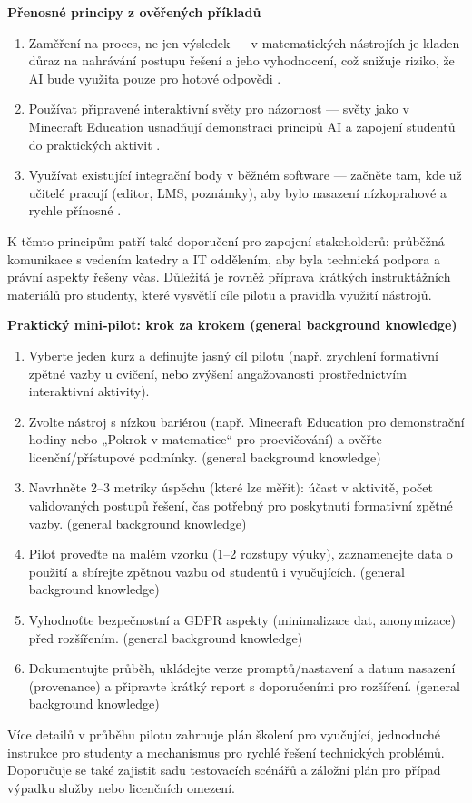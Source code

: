 \documentclass{report}%
\begin{document}
\bigskip
\noindent \textbf{Přenosné principy z ověřených příkladů}
\begin{enumerate}
  \item Zaměření na proces, ne jen výsledek — v matematických nástrojích je kladen důraz na nahrávání postupu řešení a jeho vyhodnocení, což snižuje riziko, že AI bude využita pouze pro hotové odpovědi \cite{kb_ai_101_tipu_pdf_04e4a115_page_8_1}.
  \item Používat připravené interaktivní světy pro názornost — světy jako v Minecraft Education usnadňují demonstraci principů AI a zapojení studentů do praktických aktivit \cite{kb_ai_101_tipu_pdf_04e4a115_page_15_2}.
  \item Využívat existující integrační body v běžném software — začněte tam, kde už učitelé pracují (editor, LMS, poznámky), aby bylo nasazení nízkoprahové a rychle přínosné \cite{kb_ai_101_tipu_pdf_04e4a115_page_14_1}.
\end{enumerate}
K těmto principům patří také doporučení pro zapojení stakeholderů: průběžná komunikace s vedením katedry a IT oddělením, aby byla technická podpora a právní aspekty řešeny včas.
Důležitá je rovněž příprava krátkých instruktážních materiálů pro studenty, které vysvětlí cíle pilotu a pravidla využití nástrojů.

\bigskip
\noindent \textbf{Praktický mini‑pilot: krok za krokem (general background knowledge)}
\begin{enumerate}
  \item Vyberte jeden kurz a definujte jasný cíl pilotu (např. zrychlení formativní zpětné vazby u cvičení, nebo zvýšení angažovanosti prostřednictvím interaktivní aktivity).
  \item Zvolte nástroj s nízkou bariérou (např. Minecraft Education pro demonstrační hodiny nebo „Pokrok v matematice“ pro procvičování) a ověřte licenční/přístupové podmínky. (general background knowledge)
  \item Navrhněte 2–3 metriky úspěchu (které lze měřit): účast v aktivitě, počet validovaných postupů řešení, čas potřebný pro poskytnutí formativní zpětné vazby. (general background knowledge)
  \item Pilot proveďte na malém vzorku (1–2 rozstupy výuky), zaznamenejte data o použití a sbírejte zpětnou vazbu od studentů i vyučujících. (general background knowledge)
  \item Vyhodnoťte bezpečnostní a GDPR aspekty (minimalizace dat, anonymizace) před rozšířením. (general background knowledge)
  \item Dokumentujte průběh, ukládejte verze promptů/nastavení a datum nasazení (provenance) a připravte krátký report s doporučeními pro rozšíření. (general background knowledge)
\end{enumerate}
Více detailů v průběhu pilotu zahrnuje plán školení pro vyučující, jednoduché instrukce pro studenty a mechanismus pro rychlé řešení technických problémů.
Doporučuje se také zajistit sadu testovacích scénářů a záložní plán pro případ výpadku služby nebo licenčních omezení.
\end{document}
